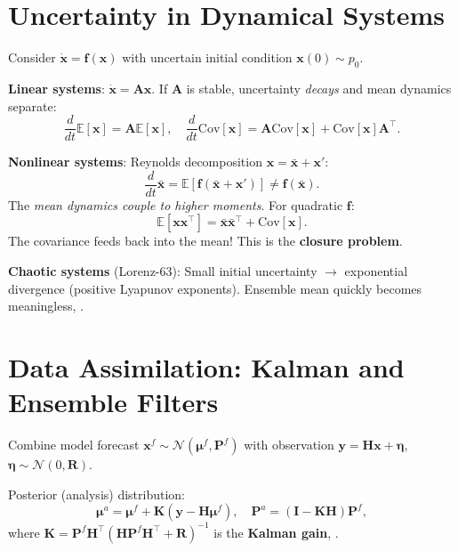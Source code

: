 \section{Uncertainty in Dynamical Systems}
\label{sec:uq:dynamical}

Consider $\dot{\bm{x}} = \bm{f}(\bm{x})$ with uncertain initial condition $\bm{x}(0) \sim p_0$.

\textbf{Linear systems}: $\dot{\bm{x}} = \bm{A}\bm{x}$. If $\bm{A}$ is stable, uncertainty \emph{decays} and mean dynamics separate: \cite{chen2025uq}
\[
\frac{d}{dt} \mathbb{E}[\bm{x}] = \bm{A} \mathbb{E}[\bm{x}], \quad \frac{d}{dt} \mathrm{Cov}[\bm{x}] = \bm{A} \mathrm{Cov}[\bm{x}] + \mathrm{Cov}[\bm{x}] \bm{A}^\top.
\]

\textbf{Nonlinear systems}: Reynolds decomposition $\bm{x} = \bar{\bm{x}} + \bm{x}'$:
\[
\frac{d}{dt} \bar{\bm{x}} = \mathbb{E}[\bm{f}(\bar{\bm{x}} + \bm{x}')] \neq \bm{f}(\bar{\bm{x}}).
\]
The \emph{mean dynamics couple to higher moments}. For quadratic $\bm{f}$:
\[
\mathbb{E}[\bm{x}\bm{x}^\top] = \bar{\bm{x}}\bar{\bm{x}}^\top + \mathrm{Cov}[\bm{x}].
\]
The covariance feeds back into the mean! This is the \textbf{closure problem}.

\textbf{Chaotic systems} (Lorenz-63): Small initial uncertainty $\to$ exponential divergence (positive Lyapunov exponents). Ensemble mean quickly becomes meaningless, \cite{chen2025uq}.

\section{Data Assimilation: Kalman and Ensemble Filters} \cite{chen2025uq}
\label{sec:uq:da}

Combine model forecast $\bm{x}^f \sim \mathcal{N}(\bm{\mu}^f, \bm{P}^f)$ with observation $\bm{y} = \bm{H}\bm{x} + \bm{\eta}$, $\bm{\eta} \sim \mathcal{N}(0, \bm{R})$.

\begin{theorem} \cite{chen2025uq}
Posterior (analysis) distribution:
\[
\bm{\mu}^a = \bm{\mu}^f + \bm{K}(\bm{y} - \bm{H}\bm{\mu}^f), \quad \bm{P}^a = (\bm{I} - \bm{K}\bm{H})\bm{P}^f,
\]
where $\bm{K} = \bm{P}^f \bm{H}^\top (\bm{H} \bm{P}^f \bm{H}^\top + \bm{R})^{-1}$ is the \textbf{Kalman gain}, \cite{chen2025uq}.
\end{theorem}

